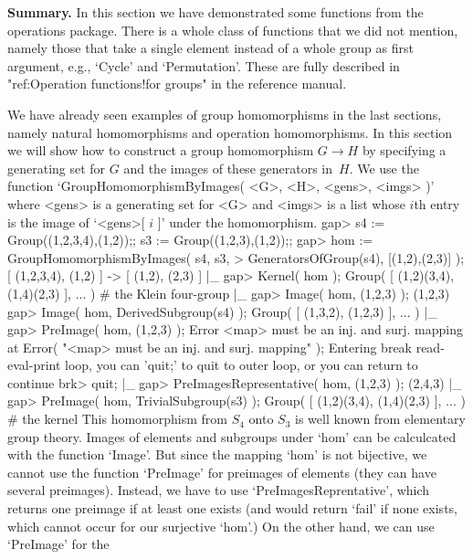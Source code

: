 {\bf  Summary.} In this section we  have demonstrated some functions from
the operations package. There  is a whole class of  functions that we did
not mention, namely  those that take a  single element instead of a whole
group as first argument, e.g., `Cycle' and `Permutation'. These are fully
described   in "ref:Operation  functions!for   groups"  in the  reference
manual.


We   have already  seen  examples of   group homomorphisms  in  the  last
sections,  namely natural homomorphisms  and  operation homomorphisms. In
this section we will show how to construct a  group homomorphism $G\to H$
by specifying a generating set for $G$ and the images of these generators
in~$H$. We use the function `GroupHomomorphismByImages( <G>, <H>, <gens>,
<imgs> )' where <gens> is a  generating set for <G> and  <imgs> is a list
whose $i$th entry is the image of `<gens>[ $i$ ]' under the homomorphism.
\beginexample
    gap> s4 := Group((1,2,3,4),(1,2));; s3 := Group((1,2,3),(1,2));;
    gap> hom := GroupHomomorphismByImages( s4, s3,
    >           GeneratorsOfGroup(s4), [(1,2),(2,3)] );
    [ (1,2,3,4), (1,2) ] -> [ (1,2), (2,3) ]
|_
    gap> Kernel( hom );
    Group( [ (1,2)(3,4), (1,4)(2,3) ], ... )  # the Klein four-group
|_
    gap> Image( hom, (1,2,3) );
    (1,2,3)
    gap> Image( hom, DerivedSubgroup(s4) );
    Group( [ (1,3,2), (1,2,3) ], ... )
|_
    gap> PreImage( hom, (1,2,3) );
    Error <map> must be an inj. and surj. mapping at
    Error( "<map> must be an inj. and surj. mapping" );
    Entering break read-eval-print loop, you can 'quit;' to quit to outer loop,
    or you can return to continue
    brk> quit;
|_
    gap> PreImagesRepresentative( hom, (1,2,3) );
    (2,4,3)
|_
    gap> PreImage( hom, TrivialSubgroup(s3) );
    Group( [ (1,2)(3,4), (1,4)(2,3) ], ... )  # the kernel
\endexample
This homomorphism  from $S_4$ onto  $S_3$  is well known  from elementary
group theory.  Images   of elements and  subgroups  under   `hom' can  be
calculcated with the function `Image'. But since the mapping `hom' is not
bijective, we  cannot use   the   function `PreImage' for  preimages   of
elements  (they can have   several preimages). Instead,   we have  to use
`PreImagesReprentative', which  returns  one  preimage if at    least one
exists (and would  return `fail' if none  exists, which  cannot occur for
our surjective `hom'.)  On the other hand, we  can use `PreImage' for the
